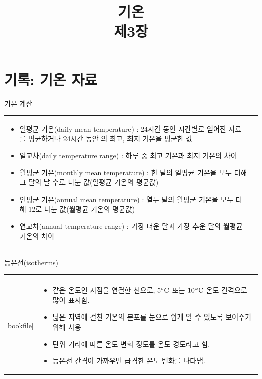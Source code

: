 \title[]{기온\\\small{제3장}}

\begin{frame}[plain] %
	\titlepage
\end{frame}


\section{기록: 기온 자료}

\begin{frame}[t]{기본 계산}
	\begin{tabular}{ll}
		\begin{minipage}[t]{0.90\textwidth}
			\begin{itemize}
				\item 일평균 기온(daily mean temperature)
				: 24시간 동안 시간별로 얻어진 자료를 평균하거나 24시간 동안
				의 최고, 최저 기온을 평균한 값
				\item 일교차(daily temperature range)
				: 하루 중 최고 기온과 최저 기온의 차이
				\item 월평균 기온(monthly mean temperature)
				: 한 달의 일평균 기온을 모두 더해 그 달의 날 수로 나눈 값(일평균 기온의 평균값)
				\item 연평균 기온(annual mean temperature)
				: 열두 달의 월평균 기온을 모두 더해 12로 나눈 값(월평균 기온의 평균값)
				\item 연교차(annual temperature range)
				: 가장 더운 달과 가장 추운 달의 월평균 기온의 차이
			\end{itemize}			
		\end{minipage}
		&
	\end{tabular}
\end{frame}




\begin{frame}[t]{등온선(isotherms)}
	\begin{tabular}{ll}
		\begin{minipage}[t]{0.60\textwidth}
			\begin{figure}[t]
				\texttt{[image: \\bookfile]}
			\end{figure}
		\end{minipage}	
		&
		\begin{minipage}[t]{0.35\textwidth} \scriptsize
			\begin{itemize}
				\item 같은 온도인 지점을 연결한 선으로, $5 \rm{^\circ}C$ 또는 $10\rm{^\circ}C$ 온도 간격으로 많이 표시함. 
				\item 넓은 지역에 걸친 기온의 분포를 눈으로 쉽게 알 수 있도록 보여주기 위해 사용
				\item 단위 거리에 따른 온도 변화 정도를 온도 경도라고 함.
				\item 등온선 간격이 가까우면 급격한 온도 변화를 나타냄.
				
			\end{itemize}
		\end{minipage}
	\end{tabular}
\end{frame}




